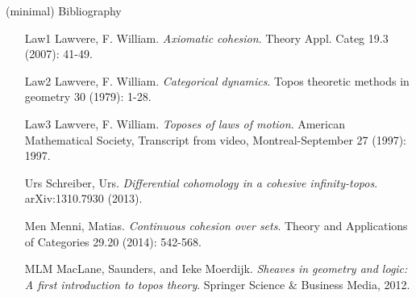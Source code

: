 \documentclass[presentation]{beamer}
\begin{document}
\begin{frame}{(minimal) Bibliography}
  \centering
  \footnotesize
  \begin{minipage}{.85\textwidth}
  \begin{itemize}
  \item[Law1] Lawvere, F. William. \emph{Axiomatic cohesion}. Theory Appl. Categ 19.3 (2007): 41-49.
  \item[Law2] Lawvere, F. William. \emph{Categorical dynamics}. Topos theoretic methods in geometry 30 (1979): 1-28.
  \item[Law3] Lawvere, F. William. \emph{Toposes of laws of motion}. American Mathematical Society, Transcript from video, Montreal-September 27 (1997): 1997.
  \item[Urs] Schreiber, Urs. \emph{Differential cohomology in a cohesive infinity-topos}. arXiv:1310.7930 (2013).
  \item[Men] Menni, Matias. \emph{Continuous cohesion over sets}. Theory and Applications of Categories 29.20 (2014): 542-568.
  \item[MLM] MacLane, Saunders, and Ieke Moerdijk. \emph{Sheaves in geometry and logic: A first introduction to topos theory}. Springer Science \& Business Media, 2012.
  \end{itemize}
  \end{minipage}
  \end{frame}  
\end{document}
